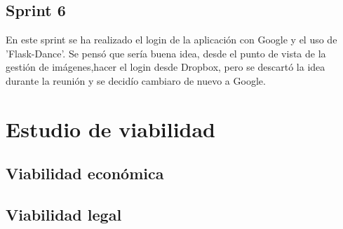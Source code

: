\subsection{Sprint 6}
En este sprint se ha realizado el login de la aplicación con Google y el uso de 'Flask-Dance'. Se pensó que sería buena idea, desde el punto de vista de la gestión de imágenes,hacer el login desde Dropbox, pero se descartó la idea durante la reunión y se decidío cambiaro de nuevo a Google.
\section{Estudio de viabilidad}

\subsection{Viabilidad económica}

\subsection{Viabilidad legal}


